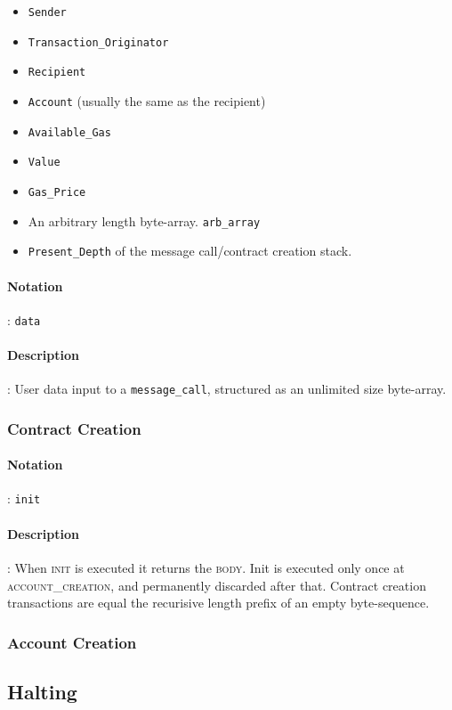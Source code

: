 \documentclass[10pt,a4paper,leqno,bibliography=totoc]{scrartcl}
\newenvironment{alphafootnotes}
{\par\edef\savedfootnotenumber{\number\value{footnote}}
\renewcommand{\thefootnote}{\alph{footnote}}
\setcounter{footnote}{0}}
{\par\setcounter{footnote}{\savedfootnotenumber}}
\begin{document}
\begin{alphafootnotes}
\begin{multicols*}{2}
\begin{itemize}
	\item \texttt{Sender}
	\item \texttt{Transaction\_Originator} 
	\item \texttt{Recipient}
	\item \texttt{Account} (usually the same as the recipient) 
	\item \texttt{Available\_Gas} 
	\item \texttt{Value}
	\item \texttt{Gas\_Price}
	\item An arbitrary length byte-array. \texttt{arb\_array}
	\item \texttt{Present\_Depth} of the message call/contract creation stack.
\end{itemize}
\paragraph{Notation}: \texttt{data}
\paragraph{Description}: User data input to a \texttt{message\_call}, structured as an unlimited size byte-array.

			\subsubsection{Contract Creation}
				\paragraph{Notation}: \texttt{init}
				\paragraph{Description}: When \textsc{init} is executed it returns the \textsc{body}. Init is executed only once at \textsc{account\_creation}, and permanently discarded after that. 				Contract creation transactions are equal the recurisive length prefix of an empty byte-sequence. 		
			\subsubsection{Account Creation}
			
			\subsection{Halting}

\end{multicols*}
\end{alphafootnotes}
\end{document}
